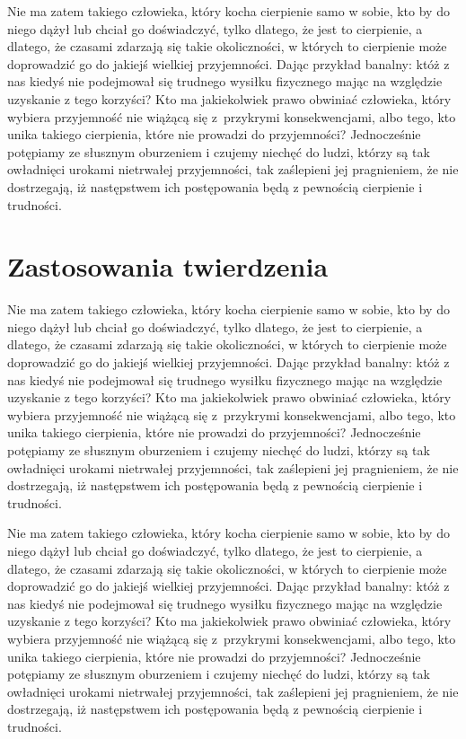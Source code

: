 \documentclass[12pt]{mwbk}
\theoremstyle{plain}
\theoremstyle{definition}
\theoremstyle{remark}
\begin{document}
Nie ma zatem takiego człowieka, który kocha cierpienie samo w sobie, 
kto by do niego dążył lub chciał go doświadczyć, tylko dlatego, że
jest to cierpienie, a dlatego, że czasami zdarzają się takie 
okoliczności, w których to cierpienie może doprowadzić 
go do jakiejś wielkiej przyjemności. 
Dając przykład banalny: któż z nas kiedyś nie podejmował 
się trudnego wysiłku fizycznego mając na względzie 
uzyskanie z tego korzyści? 
Kto ma jakiekolwiek prawo obwiniać człowieka, 
który wybiera przyjemność nie wiążącą się z~przykrymi 
konsekwencjami, albo tego, kto unika takiego cierpienia, 
które nie prowadzi do przyjemności? 
Jednocześnie potępiamy ze słusznym oburzeniem i czujemy 
niechęć do ludzi, którzy są tak owładnięci urokami nietrwałej 
przyjemności, tak zaślepieni jej pragnieniem, 
że nie dostrzegają, iż następstwem ich 
postępowania będą z pewnością cierpienie i trudności.

\section{Zastosowania twierdzenia}
Nie ma zatem takiego człowieka, który kocha cierpienie samo w sobie, 
kto by do niego dążył lub chciał go doświadczyć, tylko dlatego, że
jest to cierpienie, a dlatego, że czasami zdarzają się takie 
okoliczności, w których to cierpienie może doprowadzić 
go do jakiejś wielkiej przyjemności. 
Dając przykład banalny: któż z nas kiedyś nie podejmował 
się trudnego wysiłku fizycznego mając na względzie 
uzyskanie z tego korzyści? 
Kto ma jakiekolwiek prawo obwiniać człowieka, 
który wybiera przyjemność nie wiążącą się z~przykrymi 
konsekwencjami, albo tego, kto unika takiego cierpienia, 
które nie prowadzi do przyjemności? 
Jednocześnie potępiamy ze słusznym oburzeniem i czujemy 
niechęć do ludzi, którzy są tak owładnięci urokami nietrwałej 
przyjemności, tak zaślepieni jej pragnieniem, 
że nie dostrzegają, iż następstwem ich 
postępowania będą z pewnością cierpienie i trudności.




Nie ma zatem takiego człowieka, który kocha cierpienie samo w sobie, 
kto by do niego dążył lub chciał go doświadczyć, tylko dlatego, że
jest to cierpienie, a dlatego, że czasami zdarzają się takie 
okoliczności, w których to cierpienie może doprowadzić 
go do jakiejś wielkiej przyjemności. 
Dając przykład banalny: któż z nas kiedyś nie podejmował 
się trudnego wysiłku fizycznego mając na względzie 
uzyskanie z tego korzyści? 
Kto ma jakiekolwiek prawo obwiniać człowieka, 
który wybiera przyjemność nie wiążącą się z~przykrymi 
konsekwencjami, albo tego, kto unika takiego cierpienia, 
które nie prowadzi do przyjemności? 
Jednocześnie potępiamy ze słusznym oburzeniem i czujemy 
niechęć do ludzi, którzy są tak owładnięci urokami nietrwałej 
przyjemności, tak zaślepieni jej pragnieniem, 
że nie dostrzegają, iż następstwem ich 
postępowania będą z pewnością cierpienie i trudności.
\end{document}
